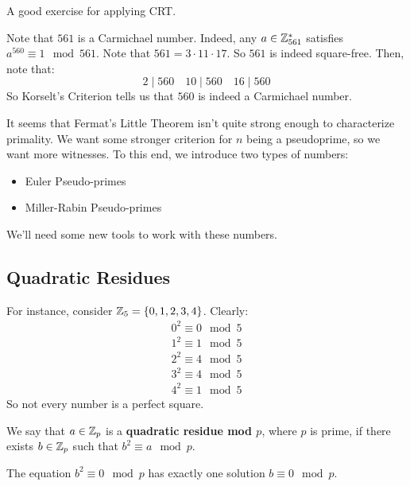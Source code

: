 \documentclass{article}
\begin{document}
\begin{pf}
    A good exercise for applying CRT.
\end{pf}

\begin{xmp}[source=Primary Source Material]
    Note that $ 561 $ is a Carmichael number.
    Indeed, any $ a \in \mathbb{Z}_{561}^{*} $ satisfies $ a^{560} \equiv 1 \mod 561 $. \vsp
    Note that $ 561 = 3 \cdot 11 \cdot 17 $.
    So $ 561 $ is indeed square-free.
    Then, note that:
    \begin{equation*}
        2 \mid 560 \quad 10 \mid 560 \quad 16 \mid 560
    \end{equation*}
    So Korselt's Criterion tells us that $ 560 $ is indeed a Carmichael number.
\end{xmp}

It seems that Fermat's Little Theorem isn't quite strong enough to characterize primality.
We want some stronger criterion for $ n $ being a pseudoprime, so we want more witnesses.
To this end, we introduce two types of numbers:
\begin{itemize}
    \item Euler Pseudo-primes
    \item Miller-Rabin Pseudo-primes
\end{itemize}
We'll need some new tools to work with these numbers.

\subsection{Quadratic Residues}

For instance, consider $ \mathbb{Z}_{5} = \left\{{0, 1, 2, 3, 4}\right\} $.
Clearly:
\begin{gather*}
    0^{2} \equiv 0 \mod 5 \\
    1^{2} \equiv 1 \mod 5 \\
    2^{2} \equiv 4 \mod 5 \\
    3^{2} \equiv 4 \mod 5 \\
    4^{2} \equiv 1 \mod 5
\end{gather*}
So not every number is a perfect square.

\begin{defn}
    We say that $ a \in \mathbb{Z}_{p} $ is a \textbf{quadratic residue mod $ p $},
    where $ p $ is prime, if there exists $ b \in \mathbb{Z}_{p} $ such that $ b^{2} \equiv a \mod p $.
\end{defn}

\begin{crll}
    The equation $ b^{2} \equiv 0 \mod p $ has exactly one solution $ b \equiv 0 \mod p $.
\end{crll}
\end{document}

